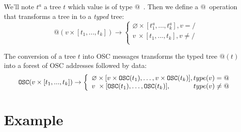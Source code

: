 \documentclass[runningheads]{llncs}
\makeatletter
\newcommand{\llist}	[1]		{\ensuremath{[#1_1,...,#1_k]}}
\newcommand{\forest}	{\ensuremath{\varnothing}}
\newcommand{\toType}	{\ensuremath{\mathcal{T}}}
\newcommand{\toAddress}	{\ensuremath{\text{@}}}
\newcommand{\toOSCAddress}	{\ensuremath{\texttt{OSC}}}
\newcommand{\taddress}	{\ensuremath{\text{@}}}
\newcommand{\toData}	{\ensuremath{\text{D}}}
\newcommand{\tdata}	    {\ensuremath{\text{D}}}
\newcommand{\etc}		{\ensuremath{\text{…}}}
\makeatother
\begin{document}
We'll note $t^a$ a tree $t$ which value is of type \taddress\ .
Then we define a \toAddress\ operation that transforms a tree in to a \emph{typed} tree:
\[
    \toAddress (v \times \llist{t}) \to 
\left\{
\begin{array}{l}
	\forest \times \llist{t^a} , v = /\\
	v \ \times \llist{t} , v \neq / \\
\end{array}
\right.
\]

The conversion of a tree $t$ into OSC messages transforms the typed tree $\toAddress (t)$ into a forest of OSC addresses followed by data:
\[
    \toOSCAddress (v \times \llist{t}) \to
\left\{
\begin{array}{l}
	\forest \times [ v \times \toOSCAddress(t_1),\etc , v \times \toOSCAddress(t_k)] , type(v) = \taddress\\
	v \ \times [ \toOSCAddress(t_1),\etc , \toOSCAddress(t_k)] , \hspace{12mm} type(v) \neq \taddress \\
\end{array}
\right.
\]








\section{Example}\label{example}
\end{document}
